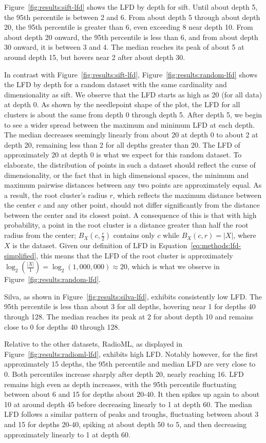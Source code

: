 Figure~\ref{fig:results:sift-lfd} shows the LFD by depth for sift.
Until about depth 5, the 95th percentile is between 2 and 6. From about depth 5 through about depth 20, the 95th percentile is greater than 6, even exceeding 8 near depth 10.
From about depth 20 onward, the 95th percentile is less than 6, and from about depth 30 onward, it is between 3 and 4.
The median reaches its peak of about 5 at around depth 15, but hovers near 2 after about depth 30.

In contrast with Figure~\ref{fig:results:sift-lfd}, Figure~\ref{fig:results:random-lfd} shows the LFD by depth for a random dataset with the same cardinality and dimensionality as sift.
We observe that the LFD starts as high as 20 (for all data) at depth 0.
As shown by the needlepoint shape of the plot, the LFD for all clusters is about the same from depth 0 through depth 5.
After depth 5, we begin to see a wider spread between the maximum and minimum LFD at each depth.
The median decreases seemingly linearly from about 20 at depth 0 to about 2 at depth 20, remaining less than 2 for all depths greater than 20.
The LFD of approximately 20 at depth 0 is what we expect for this random dataset.
To elaborate, the distribution of points in such a dataset should reflect the curse of dimensionality, or the fact that in high dimensional spaces, the minimum and maximum pairwise distances between any two points are approximately equal.
As a result, the root cluster's radius $r$, which reflects the maximum distance between the center $c$ and any other point, should not differ significantly from the distance between the center and its closest point.
A consequence of this is that with high probability, a point in the root cluster is a distance greater than half the root radius from the center; $B_X(c, \tfrac{r}{2})$ contains only $c$ while $B_X(c, r) = |X|$, where $X$ is the dataset.
Given our definition of LFD in Equation~\ref{eq:methods:lfd-simplified}, this means that the LFD of the root cluster is approximately $\log_2(\frac{|X|}{1}) = \log_2(1,000,000) \approx 20$, which is what we observe in Figure~\ref{fig:results:random-lfd}.

Silva, as shown in Figure~\ref{fig:results:silva-lfd}, exhibits consistently low LFD.
The 95th percentile is less than about 3 for all depths, hovering near 1 for depths 40 through 128.
The median reaches its peak at 2 for about depth 10 and remains close to 0 for depths 40 through 128.

Relative to the other datasets, RadioML, as displayed in Figure~\ref{fig:results:radioml-lfd}, exhibits high LFD.
Notably however, for the first approximately 15 depths, the 95th percentile and median LFD are very close to 0.
Both percentiles increase sharply after depth 20, nearly reaching 16.
LFD remains high even as depth increases, with the 95th percentile fluctuating between about 6 and 15 for depths about 20-40.
It then spikes up again to about 10 at around depth 45 before decreasing linearly to 1 at depth 60.
The median LFD follows a similar pattern of peaks and troughs, fluctuating between about 3 and 15 for depths 20-40, spiking at about depth 50 to 5, and then decreasing approximately linearly to 1 at depth 60.

